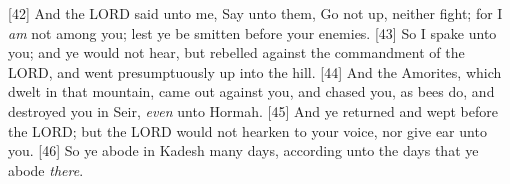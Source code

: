 [42] \textcolor[rgb]{0.00,0.00,1.00}{And the LORD said unto me, Say unto them, Go not up, neither fight; for I \emph{am} not among you; lest ye be smitten before your enemies.}
[43] \textcolor[rgb]{0.00,0.00,1.00}{So I spake unto you; and ye would not hear, but rebelled against the commandment of the LORD, and went presumptuously up into the hill.}
[44] \textcolor[rgb]{0.00,0.00,1.00}{And the Amorites, which dwelt in that mountain, came out against you, and chased you, as bees do, and destroyed you in Seir, \emph{even} unto Hormah.}
[45] \textcolor[rgb]{0.00,0.00,1.00}{And ye returned and wept before the LORD; but the LORD would not hearken to your voice, nor give ear unto you.}
[46] \textcolor[rgb]{0.00,0.00,1.00}{So ye abode in Kadesh many days, according unto the days that ye abode \emph{there}.}
\newpage
